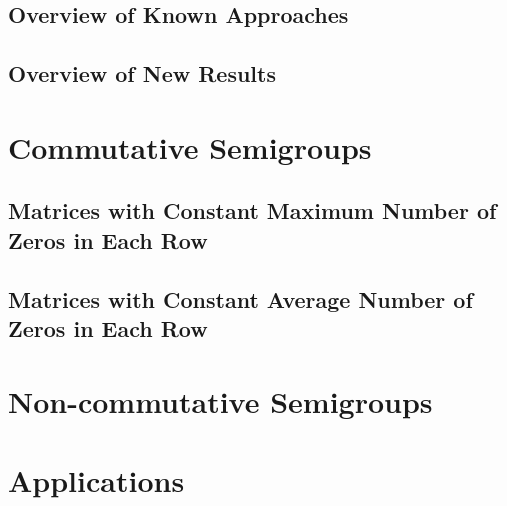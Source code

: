 \documentclass[11pt,letterpaper]{article}
\begin{document}



\subsection{Overview of Known Approaches}

\subsection{Overview of New Results}



\section{Commutative Semigroups}

\subsection{Matrices with Constant Maximum Number of Zeros in Each Row}

\subsection{Matrices with Constant Average Number of Zeros in Each Row}

\section{Non-commutative Semigroups}

\section{Applications}
\end{document}
